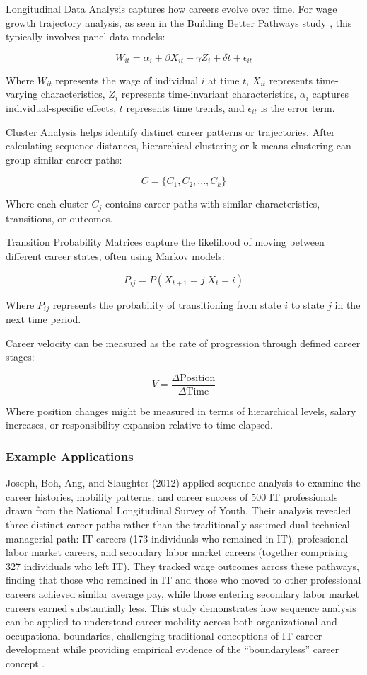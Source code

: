 \documentclass[../main.tex]{subfiles}
\begin{document}
Longitudinal Data Analysis captures how careers evolve over time. For wage growth trajectory analysis, as seen in the Building Better Pathways study \citep{workforcegps2023}, this typically involves panel data models:

\[ W_{it} = \alpha_i + \beta X_{it} + \gamma Z_i + \delta t + \epsilon_{it} \]

Where \(W_{it}\) represents the wage of individual \(i\) at time \(t\), \(X_{it}\) represents time-varying characteristics, \(Z_i\) represents time-invariant characteristics, \(\alpha_i\) captures individual-specific effects, \(t\) represents time trends, and \(\epsilon_{it}\) is the error term.

Cluster Analysis helps identify distinct career patterns or trajectories. After calculating sequence distances, hierarchical clustering or k-means clustering can group similar career paths:

\[ C = \{C_1, C_2, ..., C_k\} \]

Where each cluster \(C_j\) contains career paths with similar characteristics, transitions, or outcomes.

Transition Probability Matrices capture the likelihood of moving between different career states, often using Markov models:

\[ P_{ij} = P(X_{t+1} = j | X_t = i) \]

Where \(P_{ij}\) represents the probability of transitioning from state \(i\) to state \(j\) in the next time period.

Career velocity can be measured as the rate of progression through defined career stages:

\[ V = \frac{\Delta \text{Position}}{\Delta \text{Time}} \]

Where position changes might be measured in terms of hierarchical levels, salary increases, or responsibility expansion relative to time elapsed.

\subsubsection{Example Applications}

Joseph, Boh, Ang, and Slaughter (2012) applied sequence analysis to examine the career histories, mobility patterns, and career success of 500 IT professionals drawn from the National Longitudinal Survey of Youth. Their analysis revealed three distinct career paths rather than the traditionally assumed dual technical-managerial path: IT careers (173 individuals who remained in IT), professional labor market careers, and secondary labor market careers (together comprising 327 individuals who left IT). They tracked wage outcomes across these pathways, finding that those who remained in IT and those who moved to other professional careers achieved similar average pay, while those entering secondary labor market careers earned substantially less. This study demonstrates how sequence analysis can be applied to understand career mobility across both organizational and occupational boundaries, challenging traditional conceptions of IT career development while providing empirical evidence of the ``boundaryless'' career concept \citep{joseph2012}.
\end{document}
